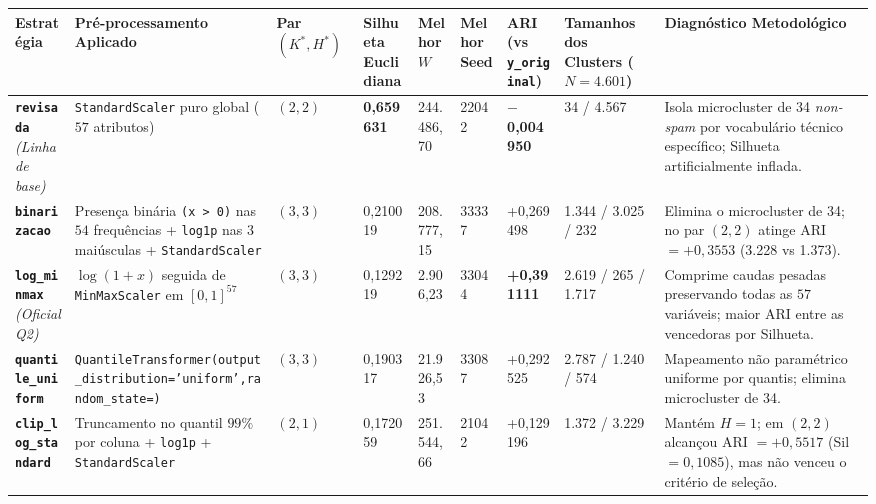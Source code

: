 \documentclass[a4paper,11pt]{article}
\begin{document}
\begin{center}
\begin{minipage}{\linewidth}
\centering
{}
\scriptsize
\sloppy
\setlength{\tabcolsep}{2.5pt}
\renewcommand{\arraystretch}{1.18}
\begin{tabularx}{\linewidth}{P{1.90cm} >{\hsize}L Q{0.92cm} Q{1.30cm} R{1.34cm} Q{0.82cm} R{1.38cm} Q{1.56cm} >{\hsize}L}
\toprule
\textbf{Estratégia} & \textbf{Pré-processamento Aplicado} & \textbf{Par $(K^*, H^*)$} & \textbf{Silhueta Euclidiana} & \textbf{Melhor $W$} & \textbf{Melhor Seed} & \textbf{ARI (vs \texttt{y\_\allowbreak original})} & \textbf{Tamanhos dos Clusters ($N=4.601$)} & \textbf{Diagnóstico Metodológico} \\
\midrule
\textbf{\texttt{revisada}} \textit{(Linha de base)} & \texttt{StandardScaler} puro global ($57$ atributos) & $(2, 2)$ & \textbf{0,659631} & 244.486,70 & 22042 & \textbf{$-$0,004950} & 34 / 4.567 & Isola microcluster de 34 \textit{non-spam} por vocabulário técnico específico; Silhueta artificialmente inflada. \\
\textbf{\texttt{binarizacao}} & Presença binária \texttt{(\allowbreak x > 0)} nas $54$ frequências + \texttt{log1p} nas $3$ maiúsculas + \texttt{StandardScaler} & $(3, 3)$ & 0,210019 & 208.777,15 & 33337 & +0,269498 & 1.344 / 3.025 / 232 & Elimina o microcluster de 34; no par $(2,2)$ atinge ARI $= +0,3553$ (3.228 vs 1.373). \\
\textbf{\texttt{log\_\allowbreak minmax}} \textit{(Oficial Q2)} & $\log(1+x)$ seguida de \texttt{MinMaxScaler} em $[0, 1]^{57}$ & $(3, 3)$ & 0,129219 & 2.906,23 & 33044 & \textbf{+0,391111} & 2.619 / 265 / 1.717 & Comprime caudas pesadas preservando todas as $57$ variáveis; maior ARI entre as vencedoras por Silhueta. \\
\textbf{\texttt{quantile\_\allowbreak uniform}} & \texttt{QuantileTransformer(\allowbreak output\_\allowbreak distribution=\allowbreak 'uniform',\allowbreak  random\_\allowbreak state=)} & $(3, 3)$ & 0,190317 & 21.926,53 & 33087 & +0,292525 & 2.787 / 1.240 / 574 & Mapeamento não paramétrico uniforme por quantis; elimina microcluster de 34. \\
\textbf{\texttt{clip\_\allowbreak log\_\allowbreak standard}} & Truncamento no quantil $99\%$ por coluna + \texttt{log1p} + \texttt{StandardScaler} & $(2, 1)$ & 0,172059 & 251.544,66 & 21042 & +0,129196 & 1.372 / 3.229 & Mantém $H=1$; em $(2,2)$ alcançou ARI $= +0,5517$ (Sil $= 0,1085$), mas não venceu o critério de seleção. \\

\end{tabularx}
\end{minipage}
\end{center}
\end{document}
